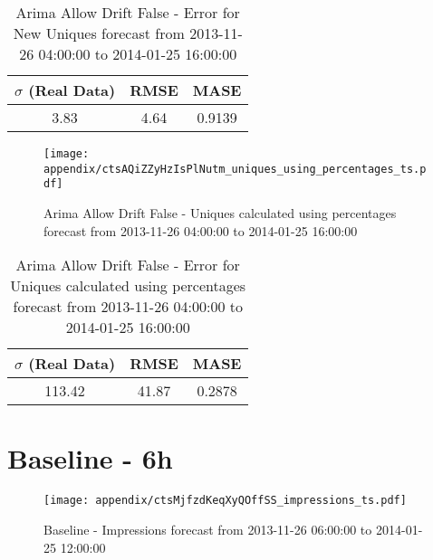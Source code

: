 \begin{table}[H]
\centering
\footnotesize
\begin{tabular}{ccc}
$\sigma$ (Real Data) & RMSE & MASE   \\ \hline
3.83 & 4.64 & 0.9139 \\
\end{tabular}

\vspace{0.5cm}

\caption[]{
Arima Allow Drift False - Error for New Uniques forecast from 2013-11-26 04:00:00 to 2014-01-25 16:00:00}
\end{table}

\begin{figure}[H] \begin{center} \leavevmode
\texttt{[image: appendix/ctsAQiZZyHzIsPlNutm\_uniques\_using\_percentages\_ts.pdf]} \caption[]{
Arima Allow Drift False - Uniques calculated using percentages forecast from 2013-11-26 04:00:00 to 2014-01-25 16:00:00} \label{fig:appendix/ctsAQiZZyHzIsPlNutm_uniques_using_percentages_ts.pdf} \end{center}
\end{figure}

\begin{table}[H]
\centering
\footnotesize
\begin{tabular}{ccc}
$\sigma$ (Real Data) & RMSE & MASE   \\ \hline
113.42 & 41.87 & 0.2878 \\
\end{tabular}

\vspace{0.5cm}

\caption[]{
Arima Allow Drift False - Error for Uniques calculated using percentages forecast from 2013-11-26 04:00:00 to 2014-01-25 16:00:00}
\end{table}

\section{Baseline - 6h}
\begin{figure}[H] \begin{center} \leavevmode
\texttt{[image: appendix/ctsMjfzdKeqXyQOffSS\_impressions\_ts.pdf]} \caption[]{
Baseline - Impressions forecast from 2013-11-26 06:00:00 to 2014-01-25 12:00:00} \label{fig:appendix/ctsMjfzdKeqXyQOffSS_impressions_ts.pdf} \end{center}
\end{figure}

